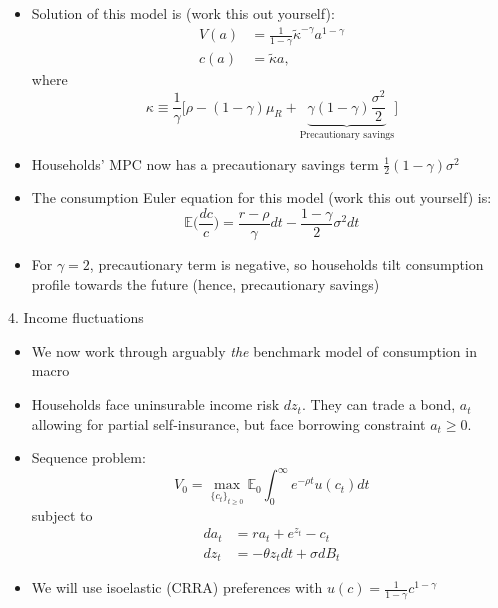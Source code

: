 \documentclass[10pt]{beamer}
\begin{document}
\begin{frame}{}
\begin{itemize}
\item Solution of this model is (work this out yourself): 
\begin{align*}
	V(a) &= \frac{1}{1-\gamma} \tilde \kappa^{-\gamma} a^{1-\gamma} \\
	c(a) &= \tilde \kappa a,
\end{align*}
where 
\begin{equation*}
	\kappa \equiv \frac{1}{\gamma} \bigg[ \rho - (1-\gamma) \mu_R + \underbrace{ \gamma(1-\gamma) \frac{\sigma^2}{2}}_\text{Precautionary savings} \bigg] 
\end{equation*}

\item Households' MPC now has a precautionary savings term $\frac{1}{2}(1-\gamma) \sigma^2$

\item The consumption Euler equation for this model (work this out yourself) is:
\begin{equation*}
	\mathbb{E} \bigg( \frac{dc}{c} \bigg) = \frac{r - \rho}{\gamma} dt - \frac{1-\gamma}{2} \sigma^2 dt
\end{equation*}

\item For $\gamma = 2$, precautionary term is negative, so households tilt consumption profile towards the future (hence, precautionary savings)
\end{itemize}
\end{frame}



\begin{frame}{4. Income fluctuations}
\begin{itemize}
\item We now work through arguably \textit{the} benchmark model of consumption in macro

\item Households face uninsurable income risk $dz_t$. They can trade a bond, $a_t$ allowing for partial self-insurance, but face borrowing constraint $a_t \geq 0$.

\item Sequence problem:
\begin{equation*}
	V_0 = \max_{ \{ c_t \}_{t \geq 0} } \mathbb{E}_0 \int_0^\infty e^{- \rho t} u(c_t) dt
\end{equation*}
subject to 
\begin{align*}
	da_t &= r a_t + e^{z_t} - c_t \\
	dz_t &= - \theta z_t dt + \sigma dB_t
\end{align*}

\item We will use isoelastic (CRRA) preferences with $u(c) = \frac{1}{1-\gamma} c^{1-\gamma}$
\end{itemize}
\end{frame}
\end{document}
